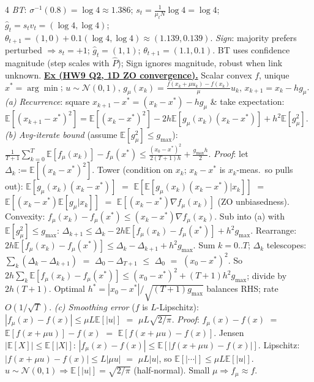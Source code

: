 \documentclass[10pt,landscape,letterpaper]{article}
\let\oldtextbf\textbf
\renewcommand{\textbf}[1]{\uline{\oldtextbf{#1}}}
\begin{document}
\begin{multicols*}{4}
\emph{BT}: \(\sigma^{-1}(0.8){=}\log 4\approx 1.386\); \(s_t{=}\tfrac{1}{\mu_t N}\log 4{=}\log 4\); \(\hat g_t{=}s_t v_t{=}(\log 4,\log 4)\); \(\theta_{t+1}{=}(1,0){+}0.1(\log 4,\log 4)\approx\mathbf{(1.139,0.139)}\).
\emph{Sign}: majority prefers perturbed \(\Rightarrow s_t{=}{+}1\); \(\hat g_t{=}(1,1)\); \(\theta_{t+1}{=}\mathbf{(1.1,0.1)}\).
BT uses confidence magnitude (step scales with \(\hat P\)); Sign ignores magnitude, robust when link unknown.
\textbf{Ex (HW9 Q2, 1D ZO convergence).} Scalar convex \(f\), unique \(x^*\!=\!\arg\min\); \(u{\sim}\mathcal N(0,1),\,g_\mu(x_k){=}\tfrac{f(x_k+\mu u_k)-f(x_k)}{\mu}u_k,\,x_{k+1}{=}x_k-hg_\mu\).
\emph{(a) Recurrence}: square \(x_{k+1}{-}x^*{=}(x_k{-}x^*){-}hg_\mu\) \& take expectation:
\(\mathbb E[(x_{k+1}{-}x^*)^2]{=}\mathbb E[(x_k{-}x^*)^2]{-}2h\mathbb E[g_\mu(x_k)(x_k{-}x^*)]{+}h^2\mathbb E[g_\mu^2]\).
\emph{(b) Avg-iterate bound} (assume \(\mathbb E[g_\mu^2]{\le}g_{\max}\)): \(\tfrac{1}{T+1}\!\sum_{k=0}^T\!\mathbb E[f_\mu(x_k)]{-}f_\mu(x^*){\le}\tfrac{(x_0-x^*)^2}{2(T+1)h}{+}\tfrac{g_{\max}h}{2}\).
\emph{Proof}: let \(\Delta_k{:=}\mathbb E[(x_k{-}x^*)^2]\). Tower (condition on \(x_k\); \(x_k{-}x^*\) is \(x_k\)-meas.\ so pulls out):
\(\mathbb E[g_\mu(x_k)(x_k{-}x^*)]\) \(=\) \(\mathbb E[\mathbb E[g_\mu(x_k)(x_k{-}x^*)|x_k]]\) \(=\) \(\mathbb E[(x_k{-}x^*)\mathbb E[g_\mu|x_k]]\) \(=\) \(\mathbb E[(x_k{-}x^*)\nabla f_\mu(x_k)]\) (ZO unbiasedness).
Convexity: \(f_\mu(x_k){-}f_\mu(x^*)\le(x_k{-}x^*)\nabla f_\mu(x_k)\).
Sub into (a) with \(\mathbb E[g_\mu^2]{\le}g_{\max}\): \(\Delta_{k+1}\!\le\!\Delta_k{-}2h\mathbb E[f_\mu(x_k){-}f_\mu(x^*)]{+}h^2g_{\max}\).
Rearrange: \(2h\mathbb E[f_\mu(x_k){-}f_\mu(x^*)]\le\Delta_k{-}\Delta_{k+1}{+}h^2g_{\max}\).
Sum \(k{=}0..T\); \(\Delta_k\) telescopes: \(\sum_k(\Delta_k{-}\Delta_{k+1})\) \(=\) \(\Delta_0{-}\Delta_{T+1}\) \(\le\) \(\Delta_0\) \(=\) \((x_0{-}x^*)^2\).
So \(2h\!\sum_k\!\mathbb E[f_\mu(x_k){-}f_\mu(x^*)]\le(x_0{-}x^*)^2{+}(T{+}1)h^2g_{\max}\); divide by \(2h(T{+}1)\).
Optimal \(h^*{=}|x_0{-}x^*|/\!\sqrt{(T{+}1)g_{\max}}\) balances RHS; rate \(O(1/\!\sqrt T)\).
\emph{(c) Smoothing error} (\(f\) is \(L\)-Lipschitz): \(|f_\mu(x){-}f(x)|\le\mu L\mathbb E[|u|]\) \(=\) \(\mu L\sqrt{2/\pi}\).
\emph{Proof}: \(f_\mu(x){-}f(x)\) \(=\) \(\mathbb E[f(x{+}\mu u)]{-}f(x)\) \(=\) \(\mathbb E[f(x{+}\mu u){-}f(x)]\).
Jensen \(|\mathbb E[X]|{\le}\mathbb E[|X|]\): \(|f_\mu(x){-}f(x)|\le\mathbb E[|f(x{+}\mu u){-}f(x)|]\).
Lipschitz: \(|f(x{+}\mu u){-}f(x)|\le L|\mu u|\) \(=\) \(\mu L|u|\), so \(\mathbb E[|\cdots|]\le\mu L\mathbb E[|u|]\).
\(u{\sim}\mathcal N(0,1)\Rightarrow\mathbb E[|u|]{=}\sqrt{2/\pi}\) (half-normal). Small \(\mu\Rightarrow f_\mu\!\approx\!f\).


\end{multicols*}
\end{document}
